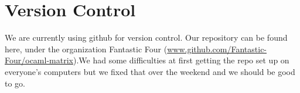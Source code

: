 \documentclass[letterpaper,11pt]{article}
\begin{document}
\section{Version Control}
We are currently using github for version control. Our repository can be found
here, under the organization Fantastic Four
(\url{www.github.com/Fantastic-Four/ocaml-matrix}).We had some difficulties at
first getting the repo set up on everyone's computers but we fixed that over the
weekend and we should be good to go.
\end{document}
